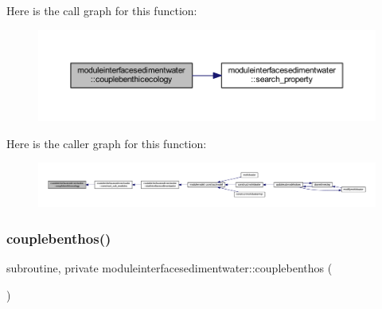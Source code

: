 Here is the call graph for this function\+:\nopagebreak
\begin{figure}[H]
\begin{center}
\leavevmode
\includegraphics[width=350pt]{namespacemoduleinterfacesedimentwater_a3f246d5d6de3e05347807acd5b8422a1_cgraph}
\end{center}
\end{figure}
Here is the caller graph for this function\+:\nopagebreak
\begin{figure}[H]
\begin{center}
\leavevmode
\includegraphics[width=350pt]{namespacemoduleinterfacesedimentwater_a3f246d5d6de3e05347807acd5b8422a1_icgraph}
\end{center}
\end{figure}
\mbox{\label{namespacemoduleinterfacesedimentwater_a0c508a9cfd619780e5dee7d75830b71a}} 
\subsubsection{\texorpdfstring{couplebenthos()}{couplebenthos()}}
{\footnotesize\ttfamily subroutine, private moduleinterfacesedimentwater\+::couplebenthos (\begin{DoxyParamCaption}{ }\end{DoxyParamCaption})\hspace{0.3cm}{\ttfamily [private]}}

